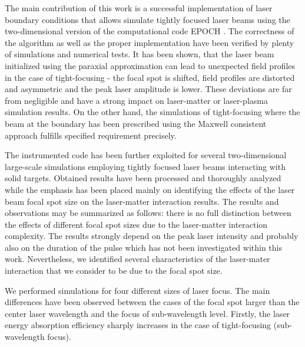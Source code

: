 The main contribution of this work is a successful implementation of laser boundary conditions that allows simulate tightly focused laser beams using the two-dimensional version of the computational code EPOCH \cite{bennett}. The correctness of the algorithm as well as the proper implementation have been verified by plenty of simulations and numerical tests. It has been shown, that the laser beam initialized using the paraxial approximation can lead to unexpected field profiles in the case of tight-focusing - the focal spot is shifted, field profiles are distorted and asymmetric and the peak laser amplitude is lower. These deviations are far from negligible and have a strong impact on laser-matter or laser-plasma simulation results. On the other hand, the simulations of tight-focusing where the beam at the boundary has been prescribed using the Maxwell consistent approach \cite{Thiele2016} fulfills specified requirement precisely.

The instrumented code has been further exploited for several two-dimensional large-scale simulations employing tightly focused laser beams interacting with solid targets. Obtained results have been processed and thoroughly analyzed while the emphasis has been placed mainly on identifying the effects of the laser beam focal spot size on the laser-matter interaction results. The results and observations may be summarized as follows: there is no full distinction between the effects of different focal spot sizes due to the laser-matter interaction complexity. The results strongly depend on the peak laser intensity and probably also on the duration of the pulse which has not been investigated within this work. Nevertheless, we identified several characteristics of the laser-mater interaction that we consider to be due to the focal spot size.

We performed simulations for four different sizes of laser focus. The main differences have been observed between the cases of the focal spot larger than the center laser wavelength and the focus of sub-wavelength level. Firstly, the laser energy absorption efficiency sharply increases in the case of tight-focusing (sub-wavelength focus). 

